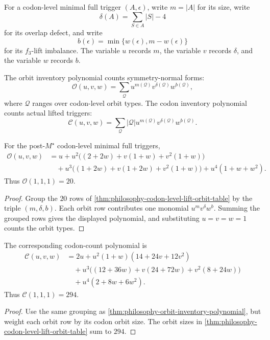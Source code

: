 \begin{definition}
\label{def:philosophy-orbit-inventory-variables}
For a codon-level minimal full trigger $(A,\epsilon)$, write
$m=|A|$ for its size, write
$$
  \delta(A)=\sum_{S\in A}|S|-4
$$
for its overlap defect, and write
$$
  b(\epsilon)=\min\{w(\epsilon),m-w(\epsilon)\}
$$
for its $f_{3}$-lift imbalance. The variable $u$ records $m$, the
variable $v$ records $\delta$, and the variable $w$ records $b$.
\end{definition}

\begin{definition}
\label{def:philosophy-orbit-codon-inventory-polynomials}
The orbit inventory polynomial counts symmetry-normal forms:
$$
  \mathcal{O}(u,v,w)
  =
  \sum_{\mathcal{Q}}u^{m(\mathcal{Q})}
  v^{\delta(\mathcal{Q})}
  w^{b(\mathcal{Q})},
$$
where $\mathcal{Q}$ ranges over codon-level orbit types. The codon
inventory polynomial counts actual lifted triggers:
$$
  \mathcal{C}(u,v,w)
  =
  \sum_{\mathcal{Q}}|\mathcal{Q}|
  u^{m(\mathcal{Q})}
  v^{\delta(\mathcal{Q})}
  w^{b(\mathcal{Q})}.
$$
\end{definition}

\begin{theorem}
\label{thm:philosophy-orbit-inventory-polynomial}
For the post-$M^{\star}$ codon-level minimal full triggers,
$$
\begin{aligned}
  \mathcal{O}(u,v,w)
  &=
  u
  +
  u^{2}\bigl((2+2w)+v(1+w)+v^{2}(1+w)\bigr)
  \\
  &\quad+
  u^{3}\bigl((1+2w)+v(1+2w)+v^{2}(1+w)\bigr)
  +
  u^{4}(1+w+w^{2}).
\end{aligned}
$$
Thus $\mathcal{O}(1,1,1)=20$.
\end{theorem}
\begin{proof}
Group the $20$ rows of
\autoref{thm:philosophy-codon-level-lift-orbit-table} by the triple
$(m,\delta,b)$. Each orbit row contributes one monomial
$u^{m}v^{\delta}w^{b}$. Summing the grouped rows gives the displayed
polynomial, and substituting $u=v=w=1$ counts the orbit types.
\end{proof}

\begin{theorem}
\label{thm:philosophy-codon-inventory-polynomial}
The corresponding codon-count polynomial is
$$
\begin{aligned}
  \mathcal{C}(u,v,w)
  &=
  2u
  +
  u^{2}(1+w)(14+24v+12v^{2})
  \\
  &\quad+
  u^{3}\bigl((12+36w)+v(24+72w)+v^{2}(8+24w)\bigr)
  \\
  &\quad+
  u^{4}(2+8w+6w^{2}).
\end{aligned}
$$
Thus $\mathcal{C}(1,1,1)=294$.
\end{theorem}
\begin{proof}
Use the same grouping as
\autoref{thm:philosophy-orbit-inventory-polynomial}, but weight each
orbit row by its codon orbit size. The orbit sizes in
\autoref{thm:philosophy-codon-level-lift-orbit-table} sum to $294$.
\end{proof}

